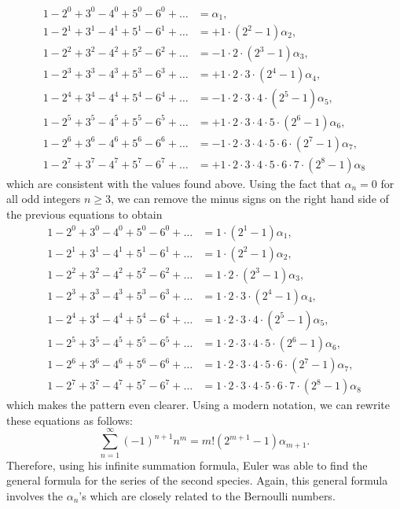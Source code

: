 \begin{align*}
    1 - 2^0 + 3^0 - 4^0 + 5^0 - 6^0 + \dots &= \alpha_1, \\
    1 - 2^1 + 3^1 - 4^1 + 5^1 - 6^1 + \dots &= +1\cdot(2^2-1)\alpha_2, \\
    1 - 2^2 + 3^2 - 4^2 + 5^2 - 6^2 + \dots &= -1\cdot 2\cdot (2^3-1) \alpha_3, \\
    1 - 2^3 + 3^3 - 4^3 + 5^3 - 6^3 + \dots &= +1\cdot 2 \cdot 3\cdot (2^4-1) \alpha_4, \\
    1 - 2^4 + 3^4 - 4^4 + 5^4 - 6^4 + \dots &= -1\cdot 2 \cdot 3\cdot 4 \cdot (2^5-1) \alpha_5, \\
    1 - 2^5 + 3^5 - 4^5 + 5^5 - 6^5 + \dots &= +1\cdot 2 \cdot 3\cdot 4 \cdot 5 \cdot  (2^6-1) \alpha_6, \\
    1 - 2^6 + 3^6 - 4^6 + 5^6 - 6^6 + \dots &= -1\cdot 2 \cdot 3\cdot 4 \cdot 5 \cdot 6 \cdot (2^7-1) \alpha_7, \\
    1 - 2^7 + 3^7 - 4^7 + 5^7 - 6^7 + \dots &= +1\cdot 2 \cdot 3\cdot 4 \cdot 5 \cdot 6 \cdot 7 \cdot (2^8-1) \alpha_8
\end{align*}
which are consistent with the values found above. Using the fact that $\alpha_{n} = 0$ for all odd integers $n \geq 3$, we can remove the minus signs on the right hand side of the previous equations to obtain
\begin{align*}
    1 - 2^0 + 3^0 - 4^0 + 5^0 - 6^0 + \dots &= 1\cdot(2^1 - 1)\alpha_1, \\
    1 - 2^1 + 3^1 - 4^1 + 5^1 - 6^1 + \dots &= 1\cdot(2^2-1)\alpha_2, \\
    1 - 2^2 + 3^2 - 4^2 + 5^2 - 6^2 + \dots &= 1\cdot 2\cdot (2^3-1) \alpha_3, \\
    1 - 2^3 + 3^3 - 4^3 + 5^3 - 6^3 + \dots &= 1\cdot 2 \cdot 3\cdot (2^4-1) \alpha_4, \\
    1 - 2^4 + 3^4 - 4^4 + 5^4 - 6^4 + \dots &= 1\cdot 2 \cdot 3\cdot 4 \cdot (2^5-1) \alpha_5, \\
    1 - 2^5 + 3^5 - 4^5 + 5^5 - 6^5 + \dots &= 1\cdot 2 \cdot 3\cdot 4 \cdot 5 \cdot  (2^6-1) \alpha_6, \\
    1 - 2^6 + 3^6 - 4^6 + 5^6 - 6^6 + \dots &= 1\cdot 2 \cdot 3\cdot 4 \cdot 5 \cdot 6 \cdot (2^7-1) \alpha_7, \\
    1 - 2^7 + 3^7 - 4^7 + 5^7 - 6^7 + \dots &= 1\cdot 2 \cdot 3\cdot 4 \cdot 5 \cdot 6 \cdot 7 \cdot (2^8-1) \alpha_8
\end{align*}
which makes the pattern even clearer. Using a modern notation, we can rewrite these equations as follows:
\begin{equation} \label{alternate negative values}
    \sum_{n=1}^{\infty}(-1)^{n+1}n^m = m!(2^{m+1} - 1)\alpha_{m+1}.
\end{equation}
Therefore, using his infinite summation formula, Euler was able to find the general formula for the series of the second species. Again, this general formula involves the $\alpha_n$'s which are closely related to the Bernoulli numbers. 


